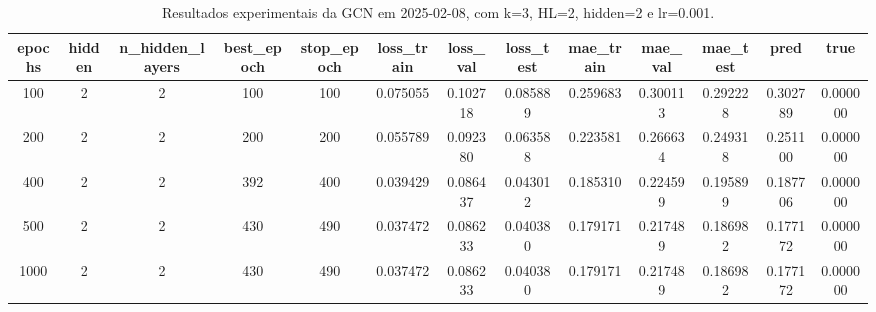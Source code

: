 \begin{table}[h]
\centering
\caption{Resultados experimentais da GCN em 2025-02-08, com k=3, HL=2, hidden=2 e lr=0.001.}
\label{tab:gcn_results_k3_hl2_h2_d20250208}
\begin{tabular}{ccccccccccccc}
\toprule
epochs & hidden & n\_hidden\_layers & best\_epoch & stop\_epoch & loss\_train & loss\_val & loss\_test & mae\_train & mae\_val & mae\_test & pred & true \\
\midrule
100 & 2 & 2 & 100 & 100 & 0.075055 & 0.102718 & 0.085889 & 0.259683 & 0.300113 & 0.292228 & 0.302789 & 0.000000 \\
200 & 2 & 2 & 200 & 200 & 0.055789 & 0.092380 & 0.063588 & 0.223581 & 0.266634 & 0.249318 & 0.251100 & 0.000000 \\
400 & 2 & 2 & 392 & 400 & 0.039429 & 0.086437 & 0.043012 & 0.185310 & 0.224599 & 0.195899 & 0.187706 & 0.000000 \\
500 & 2 & 2 & 430 & 490 & 0.037472 & 0.086233 & 0.040380 & 0.179171 & 0.217489 & 0.186982 & 0.177172 & 0.000000 \\
1000 & 2 & 2 & 430 & 490 & 0.037472 & 0.086233 & 0.040380 & 0.179171 & 0.217489 & 0.186982 & 0.177172 & 0.000000 \\
\bottomrule
\end{tabular}
\end{table}
